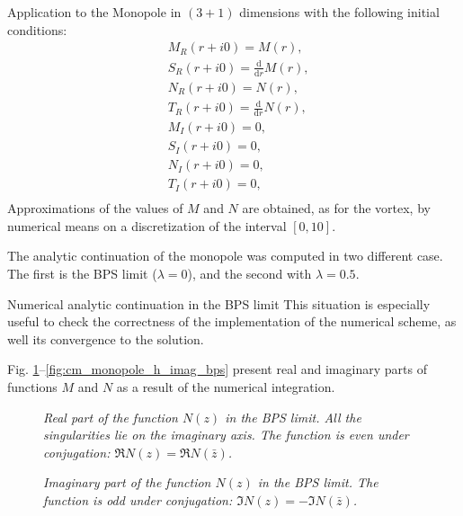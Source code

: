 \begin{section}{Application to the Monopole in $(3+1)$ dimensions}
  with the following initial conditions:
  \begin{align}
    &M_R(r+i0) = M(r),\\
    &S_R(r+i0) = \frac{\mathrm d}{\mathrm d r}M(r),\\
    &N_R(r+i0) = N(r),\\
    &T_R(r+i0) = \frac{\mathrm d}{\mathrm d r}N(r),\\
    &M_I(r+i0) = 0,\\
    &S_I(r+i0) = 0,\\
    &N_I(r+i0) = 0,\\
    &T_I(r+i0) = 0,\\
  \end{align}
  Approximations of the values of $M$ and $N$ are obtained, as for the
  vortex, by numerical means on a discretization of the interval
  $[0,10]$.
  
  The analytic continuation of the monopole was computed in two
  different case. The first is the BPS limit ($\lambda = 0$), and the
  second with $\lambda = 0.5$. 
  \begin{subsection}{Numerical analytic continuation in the BPS limit}
    This situation is especially useful to check the correctness of
    the implementation of the numerical scheme, as well its
    convergence to the solution. 
    
    Fig. \ref{fig:cm_monopole_f_real_bps}--\ref{fig:cm_monopole_h_imag_bps}
    present real and imaginary parts of functions $M$ and $N$ as a
    result of the numerical integration.

    \begin{figure}[!ht]
      \begin{center}
        
        \caption{\em Real part of the function $N(z)$ in the BPS
          limit. All the singularities lie on the imaginary axis. The
          function is even under conjugation: $\Re N(z) = \Re N(\bar
          z)$.}
        \label{fig:cm_monopole_f_real_bps}
      \end{center}
    \end{figure}

    \begin{figure}[!ht]
      \begin{center}
        
        \caption{\em Imaginary part of the function $N(z)$ in the BPS
          limit. The function is odd under conjugation: $\Im N(z) =
          -\Im N(\bar z)$.}
        \label{fig:cm_monopole_f_imag_bps}
      \end{center}
    \end{figure}


\end{subsection}
\end{section}
